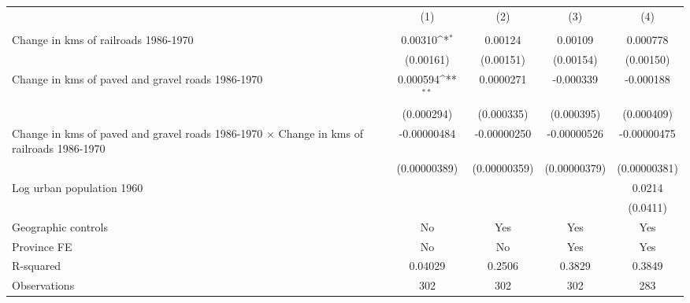 {
\def\sym#1{\ifmmode^{#1}\else\(^{#1}\)\fi}
\begin{tabular}{l*{4}{c}}
\hline\hline
                &\multicolumn{1}{c}{(1)}&\multicolumn{1}{c}{(2)}&\multicolumn{1}{c}{(3)}&\multicolumn{1}{c}{(4)}\\
                &\multicolumn{1}{c}{}&\multicolumn{1}{c}{}&\multicolumn{1}{c}{}&\multicolumn{1}{c}{}\\
\hline
Change in kms of railroads 1986-1970&  0.00310\sym{*}  &  0.00124         &  0.00109         & 0.000778         \\
                &(0.00161)         &(0.00151)         &(0.00154)         &(0.00150)         \\
[1em]
Change in kms of paved and gravel roads 1986-1970& 0.000594\sym{**} &0.0000271         &-0.000339         &-0.000188         \\
                &(0.000294)         &(0.000335)         &(0.000395)         &(0.000409)         \\
[1em]
Change in kms of paved and gravel roads 1986-1970 $\times$ Change in kms of railroads 1986-1970&-0.00000484         &-0.00000250         &-0.00000526         &-0.00000475         \\
                &(0.00000389)         &(0.00000359)         &(0.00000379)         &(0.00000381)         \\
[1em]
Log urban population 1960&                  &                  &                  &   0.0214         \\
                &                  &                  &                  & (0.0411)         \\
\hline
Geographic controls&       No         &      Yes         &      Yes         &      Yes         \\
Province FE     &       No         &       No         &      Yes         &      Yes         \\
R-squared       &  0.04029         &   0.2506         &   0.3829         &   0.3849         \\
Observations    &      302         &      302         &      302         &      283         \\
\hline\hline
\end{tabular}
}
